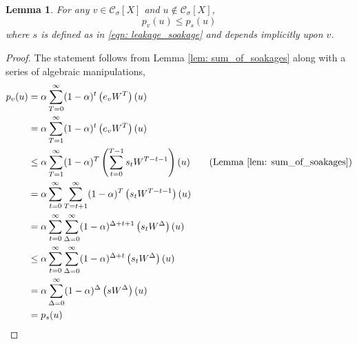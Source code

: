 \documentclass[11pt,twoside]{article}
\newtheorem{lemma}{Lemma}
\theoremstyle{definition}
\newcommand{\1}{\mathbbm{1}}
\newcommand{\pbf}{p}        %
\newcommand{\Xbf}{X}
\newcommand{\Wbf}{W}
\newcommand{\Cset}{\mathcal{C}}
\newcommand{\Csig}{\Cset_{\sigma}}
\begin{document}
\begin{lemma}
	\label{lem: soakage_ppr_lb}
	For any $v \in \Csig[\Xbf]$ and $u \not\in \Csig[\Xbf]$,
	\begin{equation*}
	\pbf_{v}(u) \leq \pbf_{s}(u)
	\end{equation*}
	where $s$ is defined as in \eqref{eqn: leakage_soakage} and depends implicitly upon $v$.
\end{lemma}
\begin{proof}
	The statement follows from Lemma \ref{lem: sum_of_soakages} along with a series of algebraic manipulations,
	\begin{align*}
	\pbf_v(u) & = \alpha\sum_{T = 0}^{\infty} (1 - \alpha)^t \left(e_v \Wbf^T\right)(u) \\
	& = \alpha\sum_{T = 1}^{\infty} (1 - \alpha)^t \left(e_v \Wbf^T\right)(u) \\
	& \leq \alpha \sum_{T=1}^{\infty} (1 - \alpha)^T \left( \sum_{t = 0}^{T - 1} s_t \Wbf^{T - t - 1} \right)(u) \tag{Lemma \ref{lem: sum_of_soakages}}\\
	& = \alpha \sum_{t=0}^{\infty} \sum_{T = t + 1}^{\infty} (1 - \alpha)^T \left( s_t \Wbf^{T - t - 1} \right)(u)\\
	& = \alpha \sum_{t=0}^{\infty} \sum_{\Delta = 0}^{\infty} (1 - \alpha)^{\Delta + t + 1} \left( s_t \Wbf^{\Delta} \right)(u) \\
	& \leq \alpha \sum_{t=0}^{\infty} \sum_{\Delta = 0}^{\infty} (1 - \alpha)^{\Delta + t } \left( s_t \Wbf^{\Delta} \right)(u) \\
	& = \alpha \sum_{\Delta = 0}^{\infty} (1 - \alpha)^{\Delta} \left(s \Wbf^{\Delta}\right)(u) \\
	& = \pbf_s(u)
	\end{align*}
\end{proof}
\end{document}
